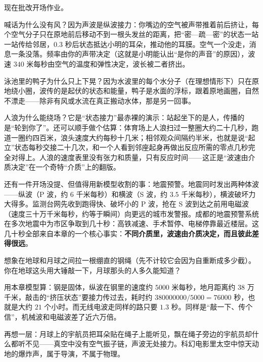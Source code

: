 
\begin{mainline}
现在批改开场作业。

喊话为什么没有风？因为声波是纵波接力：你嘴边的空气被声带推着前后挤让，每个空气分子只在原地前后移动不到一根头发丝的距离，把“密—疏—密”的状态一站一站传给邻居，\(0.3\) 秒后状态抵达小明的耳朵，推动他的耳膜。空气一个没走，消息一条没落。频率由你的声带决定（这就是小明能认出“是你的声音”的原因），波速 \(340\) 米每秒由空气的温度和弹性决定，波长被二者挤出。

泳池里的鸭子为什么只上下晃？因为水波里的每个水分子（在理想情形下）只在原地绕小圈，波传的是起伏的状态和能量，鸭子是水面的浮标，跟着原地画圈，自然不漂走——除非有风或水流在真正搬动水体，那是另一回事。

人浪为什么能绕场？它是“状态接力”最赤裸的演示：站起坐下的是人，传播的是“轮到你了”。还可以顺手做个估算：体育场上人浪扫过一整圈大约二十几秒，跑道一圈约四百米，浪头速度大约每秒十几米；相邻观众间隔约半米，也就是说“起立”状态每秒交接二十几次，和一个人看到邻座起身再做出反应所需的零点几秒完全对得上。人浪的速度表里没有张力和质量，只有反应时间——这正是“波速由介质决定”在一个奇特“介质”上的翻版。

还有一件开场没提、但值得用新模型收割的事：地震预警。地震同时发出两种体波——纵波（P 波，约 \(6\) 千米每秒）和横波（S 波，约 \(3.5\) 千米每秒），横波破坏力大得多。监测台网先收到跑得快、破坏小的 P 波，抢在 S 波到达之前用电磁波（速度三十万千米每秒，约等于瞬间）向更远的城市发警报。成都的地震预警系统在多次地震中为市区争取到几十秒：高铁减速、手术暂停、电梯停靠最近楼层。这几十秒全部来自本章的一个核心事实：\textbf{不同介质里，波速由介质决定，而且彼此差得很远}。
\end{mainline}


\begin{thought}[地月钢绳]
想象在地球和月球之间拉一根绷直的钢绳（先不计较它会因为自重断成多少截）。你在地球这头用大锤敲一下，月球那头的人多久能知道？

用本章模型算：钢是固体，纵波在钢里的速度约 \(5000\) 米每秒，地月距离约 \(38\) 万千米，敲击的“挤压状态”要接力传过去，耗时约 \(380000000/5000 = 76000\) 秒，也就是大约 \(21\) 个小时。而无线电波走同样的路只要 \(1.3\) 秒。同样是“敲一下、传个信”，机械波和电磁波差了近六万倍。

再想一层：月球上的宇航员把耳朵贴在绳子上能听见，飘在绳子旁边的宇航员却什么都听不见——真空中没有空气振子链，声波无处接力。科幻电影里太空中惊天动地的爆炸声，属于导演，不属于物理。
\end{thought}


